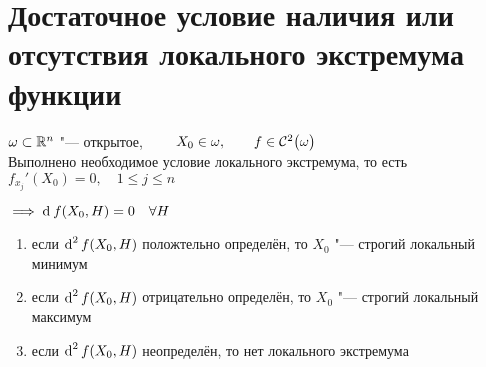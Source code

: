 \section{Достаточное условие наличия или отсутствия локального экстремума функции}

\begin{theorem}
	$ \omega \sub \R^n $ "--- открытое, $ \qquad X_0 \in \omega, \qquad f \in \Cont[2]\omega $ \\
	Выполнено необходимое условие локального экстремума, то есть $ f_{x_j}'(X_0) = 0, \quad 1 \le j \le n $
	\begin{remark}
		$ \implies \di f(X_0, H) = 0 \quad \forall H $
	\end{remark}
	\begin{enumerate}
		\item\label{th:extremum:4} если $ \di[2] f(X_0, H) $ положтельно определён, то $ X_0 $ "--- строгий локальный минимум

		\item\label{th:extremum:5} если $ \di[2] f(X_0, H) $ отрицательно определён, то $ X_0 $ "--- строгий локальный максимум

		\item\label{th:extremum:6} если $ \di[2] f(X_0, H) $ неопределён, то нет локального экстремума
	\end{enumerate}
\end{theorem}

